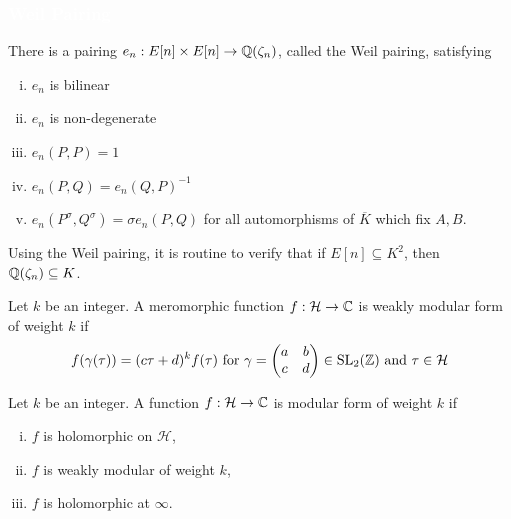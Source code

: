 \begin{frame}[plain]
\frametitle{\textcolor{white}{Weil Pairing}}
There is a pairing $e_n: E[n] \times E[n] \to \mathbb{Q}(\zeta_n)$, called the Weil pairing, satisfying \pspace

\begin{enumerate}[(i)]
\item $e_n$ is bilinear
\item $e_n$ is non-degenerate 
\item $e_n(P,P)= 1$
\item $e_n(P,Q)= e_n(Q,P)^{-1}$
\item $e_n(P^\sigma,Q^\sigma)= \sigma e_n(P,Q)$ for all automorphisms of $\overline{K}$ which fix $A,B$.
\end{enumerate}

\begin{rem}
Using the Weil pairing, it is routine to verify that if $E[n] \subseteq K^2$, then $\mathbb{Q}(\zeta_n) \subseteq K$.
\end{rem}
\end{frame}



\begin{frame}
\begin{dfn}
Let $k$ be an integer. A meromorphic function $f: \mathcal{H} \to \mathbb{C}$ is weakly modular form of weight $k$ if
	\[
	f(\gamma(\tau))= (c\tau+d)^k f(\tau) \text{ for } \gamma= \begin{pmatrix} a & b \\ c & d \end{pmatrix} \in \text{SL}_2(\mathbb{Z}) \text{ and } \tau  \in \mathcal{H}
	\]
\end{dfn}

\begin{dfn}
Let $k$ be an integer. A function $f: \mathcal{H} \to \mathbb{C}$ is modular form of weight $k$ if

\begin{enumerate}[(i)]
\item $f$ is holomorphic on $\mathcal{H}$,
\item $f$ is weakly modular of weight $k$,
\item $f$ is holomorphic at $\infty$. 
\end{enumerate}
\end{dfn}

\end{frame}




